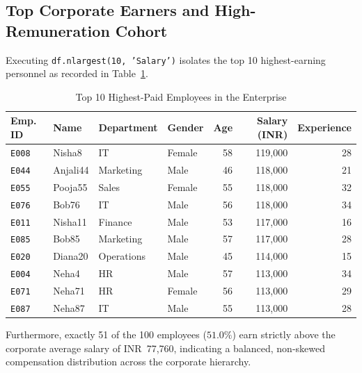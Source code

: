 \documentclass[12pt,a4paper]{report}
\begin{document}
\subsection{Top Corporate Earners and High-Remuneration Cohort}
Executing \texttt{df.nlargest(10, 'Salary')} isolates the top 10 highest-earning personnel as recorded in Table~\ref{tab:exp1_top10}.
\begin{table}[H]
\centering
\small
\caption{Top 10 Highest-Paid Employees in the Enterprise}
\label{tab:exp1_top10}
\begin{tabular}{llllrrr}
\toprule
\textbf{Emp. ID} & \textbf{Name} & \textbf{Department} & \textbf{Gender} & \textbf{Age} & \textbf{Salary (INR)} & \textbf{Experience} \\
\midrule
\texttt{E008} & Nisha8 & IT & Female & 58 & 119,000 & 28 \\
\texttt{E044} & Anjali44 & Marketing & Male & 46 & 118,000 & 21 \\
\texttt{E055} & Pooja55 & Sales & Female & 55 & 118,000 & 32 \\
\texttt{E076} & Bob76 & IT & Male & 56 & 118,000 & 34 \\
\texttt{E011} & Nisha11 & Finance & Male & 53 & 117,000 & 16 \\
\texttt{E085} & Bob85 & Marketing & Male & 57 & 117,000 & 28 \\
\texttt{E020} & Diana20 & Operations & Male & 45 & 114,000 & 15 \\
\texttt{E004} & Neha4 & HR & Male & 57 & 113,000 & 34 \\
\texttt{E071} & Neha71 & HR & Female & 56 & 113,000 & 29 \\
\texttt{E087} & Neha87 & IT & Male & 55 & 113,000 & 28 \\
\bottomrule
\end{tabular}
\end{table}

Furthermore, exactly 51 of the 100 employees ($51.0\%$) earn strictly above the corporate average salary of INR~77,760, indicating a balanced, non-skewed compensation distribution across the corporate hierarchy.
\end{document}
